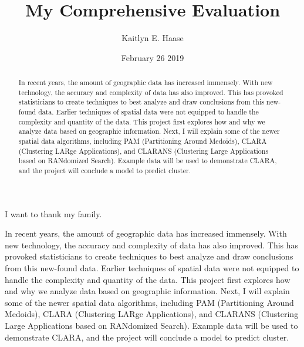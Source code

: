 \documentclass[12pt,twoside]{amherstthesis}
\title{My Comprehensive Evaluation}
\author{Kaitlyn E. Haase}
\date{February 26 2019}
\begin{document}
      \maketitle
  
  \frontmatter %
  \pagestyle{empty} %

      \begin{acknowledgements}
      I want to thank my family.
    \end{acknowledgements}
  
  

      \hypersetup{linkcolor=black}
    \setcounter{tocdepth}{2}
    \tableofcontents
  
      \listoftables
  
      \listoffigures
  
      \begin{abstract}
      In recent years, the amount of geographic data has increased immensely.
      With new technology, the accuracy and complexity of data has also
      improved. This has provoked statisticians to create techniques to best
      analyze and draw conclusions from this new-found data. Earlier
      techniques of spatial data were not equipped to handle the complexity
      and quantity of the data. This project first explores how and why we
      analyze data based on geographic information. Next, I will explain some
      of the newer spatial data algorithms, including PAM (Partitioning Around
      Medoids), CLARA (Clustering LARge Applications), and CLARANS (Clustering
      Large Applications based on RANdomized Search). Example data will be
      used to demonstrate CLARA, and the project will conclude a model to
      predict cluster.
    \end{abstract}
  
  
  \mainmatter %
  \pagestyle{fancyplain} %

  In recent years, the amount of geographic data has increased immensely.
  With new technology, the accuracy and complexity of data has also
  improved. This has provoked statisticians to create techniques to best
  analyze and draw conclusions from this new-found data. Earlier
  techniques of spatial data were not equipped to handle the complexity
  and quantity of the data. This project first explores how and why we
  analyze data based on geographic information. Next, I will explain some
  of the newer spatial data algorithms, including PAM (Partitioning Around
  Medoids), CLARA (Clustering LARge Applications), and CLARANS (Clustering
  Large Applications based on RANdomized Search). Example data will be
  used to demonstrate CLARA, and the project will conclude a model to
  predict cluster.
  
\end{document}
